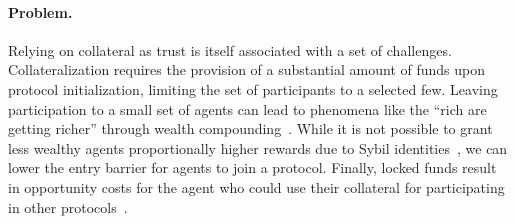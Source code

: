 \documentclass[runningheads]{llncs}
\newcommand{\aza}[1]{\todo[linecolor=blue,backgroundcolor=blue!25,bordercolor=blue,inline,caption={}]{Comment by Alexei: #1}}
\begin{document}
\paragraph{Problem.}
Relying on collateral as trust is itself associated with a set of challenges. 
Collateralization requires the provision of a substantial amount of funds upon protocol initialization, limiting the set of participants to a selected few.
Leaving participation to a small set of agents can lead to phenomena like the ``rich are getting richer'' through wealth compounding~\cite{Fanti2019Compounding}.
While it is not possible to grant less wealthy agents proportionally higher rewards due to Sybil identities~\cite{douceur2002sybil}, we can lower the entry barrier for agents to join a protocol.
Finally, locked funds result in opportunity costs for the agent who could use their collateral for participating in other protocols~\cite{Harz2019Balance}.


\end{document}

